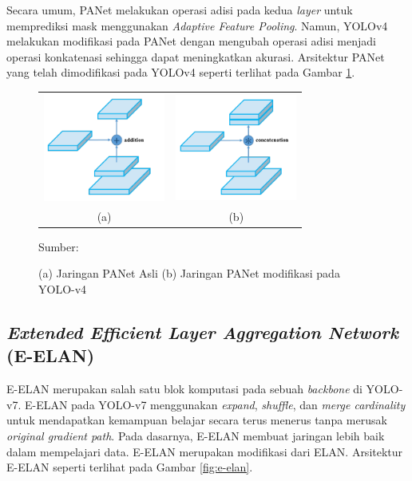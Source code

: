 \begin{enumerate}
        Secara umum, PANet melakukan operasi adisi pada kedua \textit{layer} untuk memprediksi mask menggunakan \textit{Adaptive Feature Pooling}. Namun, YOLOv4 melakukan modifikasi pada PANet dengan mengubah operasi adisi menjadi operasi konkatenasi sehingga dapat meningkatkan akurasi. Arsitektur PANet yang telah dimodifikasi pada YOLOv4 seperti terlihat pada Gambar \ref{fig:panet}.

        \begin{figure}[H]
            \centering
            \begin{tabular}{cc}
                \includegraphics[width=4cm]{../img/PANet Original - Latex.PNG}
                &
                \includegraphics[width=4cm]{../img/PANet Modified - Latex.PNG}\\
                (a) &(b)\\
            \end{tabular}
            \caption{(a) Jaringan PANet Asli (b) Jaringan PANet modifikasi pada YOLO-v4}
            \label{fig:panet}
            Sumber: \citep{Bochkovskiy2020}
        \end{figure}

    \end{enumerate}

    \subsection{\textit{Extended Efficient Layer Aggregation Network} (E-ELAN)}
    E-ELAN merupakan salah satu blok komputasi pada sebuah \textit{backbone} di YOLO-v7. E-ELAN pada YOLO-v7 menggunakan \textit{expand}, \textit{shuffle}, dan \textit{merge cardinality} untuk mendapatkan kemampuan belajar secara terus menerus tanpa merusak \textit{original gradient path}. Pada dasarnya, E-ELAN membuat jaringan lebih baik dalam mempelajari data. E-ELAN merupakan modifikasi dari ELAN. Arsitektur E-ELAN seperti terlihat pada Gambar \ref{fig:e-elan}.

